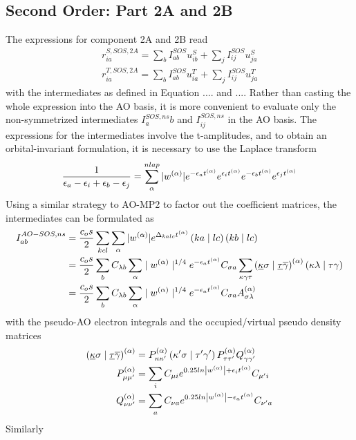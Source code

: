 \subsection{Second Order: Part 2A and 2B}

The expressions for component 2A and 2B read
\begin{align}
r_{ia}^{S,SOS,2A} = \sum_b I^{SOS}_{ab} u^S_{ib} + \sum_j I^{SOS}_{ij} u^S_{ja} \\
r_{ia}^{T,SOS,2A} = \sum_b I^{SOS}_{ab} u^T_{ia} + \sum_j I^{SOS}_{ij} u^T_{ja} 
\end{align}
\noindent with the intermediates as defined in Equation ....  and .... Rather than casting the whole expression into the AO basis, it is more convenient to evaluate only the non-symmetrized intermediates $I^{SOS,ns}_ab$ and $I^{SOS,ns}_{ij}$ in the AO basis.
The expressions for the intermediates involve the t-amplitudes, and to obtain an orbital-invariant formulation, it is necessary to use the Laplace transform
\begin{equation}
\frac{1}{\epsilon_a - \epsilon_i + \epsilon_b - \epsilon_j} = \sum^{nlap}_{\alpha} |w^{(\alpha)}| e^{-\epsilon_a t^{(\alpha)}} e^{\epsilon_i t^{(\alpha)}} e^{-\epsilon_b t^{(\alpha)}} e^{\epsilon_j t^{(\alpha)}} 
\end{equation}
\noindent Using a similar strategy to AO-MP2 to factor out the coefficient matrices, the intermediates can be formulated as
\begin{align}
I_{ab}^{AO-SOS,ns} &= \frac{c_os}{2} \sum_{kcl} \sum_{\alpha} |w^{(\alpha)}| e^{\Delta_{kalc}t^{(\alpha)}} \left( ka \mid lc \right) \left( kb \mid lc \right) \\
&= \frac{c_os}{2} \sum_b C_{\lambda b} \sum_{\alpha} \mid w^{(\alpha)}\mid^{1/4} e^{-\epsilon_a t^{(\alpha)}} C_{\sigma a} \sum_{\kappa \gamma \tau} \left( \underline{\kappa} \sigma \mid \underline{\tau} \overline{\gamma} \right)^{(\alpha)} \left( \kappa \lambda \mid \tau \gamma \right) \\
&= \frac{c_os}{2} \sum_b C_{\lambda b} \sum_{\alpha} \mid w^{(\alpha)}\mid^{1/4} e^{-\epsilon_a t^{(\alpha)}} C_{\sigma a} A^{(\alpha)}_{\sigma\lambda}
\end{align}
\noindent with the pseudo-AO electron integrals and the occupied/virtual pseudo density matrices
\begin{align}
\left( \underline{\kappa} \sigma \mid \underline{\tau} \overline{\gamma} \right)^{(\alpha)} &= P_{\kappa\kappa'}^{(\alpha)} \left( \kappa' \sigma \mid \tau' \gamma' \right) P_{\tau\tau'}^{(\alpha)} Q_{\gamma\gamma'}^{(\alpha)} \\
P_{\mu\mu'}^{(\alpha)} &= \sum_i C_{\mu i} e^{0.25 ln\left\lvert w^{(\alpha)} \right\rvert + \epsilon_i t^{(\alpha)}} C_{\mu' i} \\
Q_{\nu\nu'}^{(\alpha)} &= \sum_a C_{\nu a} e^{0.25 ln\left\lvert w^{(\alpha)} \right\rvert - \epsilon_a t^{(\alpha)}} C_{\nu' a}
\end{align}
Similarly
